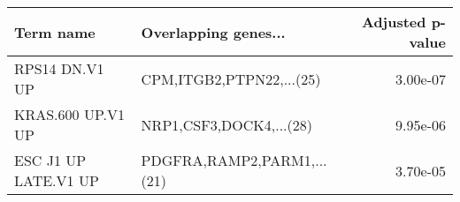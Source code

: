 \begin{tabular}{llr}
\toprule
           Term name &       Overlapping genes... &  Adjusted p-value \\
\midrule
      RPS14 DN.V1 UP &   CPM,ITGB2,PTPN22,...(25) &          3.00e-07 \\
   KRAS.600 UP.V1 UP &    NRP1,CSF3,DOCK4,...(28) &          9.95e-06 \\
ESC J1 UP LATE.V1 UP & PDGFRA,RAMP2,PARM1,...(21) &          3.70e-05 \\
\bottomrule
\end{tabular}
